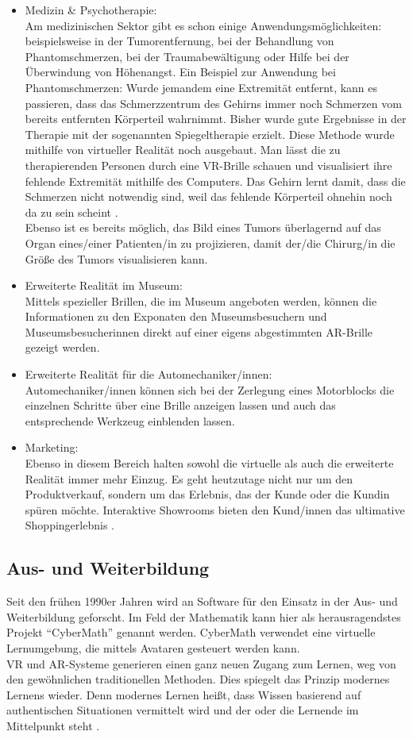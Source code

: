 \documentclass[deutsch]{llncs}
\begin{document}
\begin{itemize}
\item Medizin \& Psychotherapie:\\
Am medizinischen Sektor gibt es schon einige Anwendungsmöglichkeiten: beispielsweise in der Tumorentfernung, bei der Behandlung von Phantomschmerzen, bei der Traumabewältigung oder Hilfe bei der Überwindung von Höhenangst. 
Ein Beispiel zur Anwendung bei Phantomschmerzen: Wurde jemandem eine Extremität entfernt, kann es passieren, dass das Schmerzzentrum des Gehirns immer noch Schmerzen vom bereits entfernten Körperteil wahrnimmt. Bisher wurde gute Ergebnisse in der Therapie mit der sogenannten Spiegeltherapie erzielt. Diese Methode wurde mithilfe von virtueller Realität noch ausgebaut. Man lässt die zu therapierenden Personen durch eine VR-Brille schauen und visualisiert ihre fehlende Extremität mithilfe des Computers. Das Gehirn lernt damit, dass die Schmerzen nicht notwendig sind, weil das fehlende Körperteil ohnehin noch da zu sein scheint \cite{psycho}.  \\
Ebenso ist es bereits möglich, das Bild eines Tumors überlagernd auf das Organ eines/einer Patienten/in zu projizieren, damit der/die Chirurg/in die Größe des Tumors visualisieren kann.
\item Erweiterte Realität im Museum: \\
Mittels spezieller Brillen, die im Museum angeboten werden, können die Informationen zu den Exponaten den Museumsbesuchern und Museumsbesucherinnen direkt auf einer eigens abgestimmten AR-Brille gezeigt werden. 
\item Erweiterte Realität für die Automechaniker/innen:\\
Automechaniker/innen können sich bei der Zerlegung eines Motorblocks die einzelnen Schritte über eine Brille anzeigen lassen und auch das entsprechende Werkzeug einblenden lassen. 
\item Marketing: \\
Ebenso in diesem Bereich halten sowohl die virtuelle als auch die erweiterte Realität immer mehr Einzug. Es geht heutzutage nicht nur um den Produktverkauf, sondern um das Erlebnis, das der Kunde oder die Kundin spüren möchte. Interaktive Showrooms bieten den Kund/innen das ultimative Shoppingerlebnis \cite{}.

\end{itemize}
\subsection{Aus- und Weiterbildung}
Seit den frühen 1990er Jahren wird an Software für den Einsatz in der Aus- und Weiterbildung geforscht. Im Feld der Mathematik kann hier als herausragendstes Projekt ``CyberMath'' genannt werden. CyberMath verwendet eine virtuelle Lernumgebung, die mittels Avataren gesteuert werden kann. \\
VR und AR-Systeme generieren einen ganz neuen Zugang zum Lernen, weg von den gewöhnlichen traditionellen Methoden. Dies spiegelt das Prinzip modernes Lernens wieder. Denn modernes Lernen heißt, dass Wissen basierend auf authentischen Situationen vermittelt wird und der oder die Lernende im Mittelpunkt steht \cite{Klampfer,unknown}.
\end{document}
